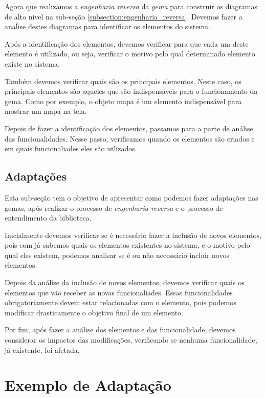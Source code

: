 Agora que realizamos a \emph{engenharia reversa} da \emph{gema} para construir os diagramas
de alto nível na sub-seção \ref{subsection:engenharia_reversa}. Devemos fazer a anaĺise destes
diagramas para identificar os elementos do sistema.

Após a identificação dos elementos, devemos verificar para que cada um deste elemento é utilizado, ou seja,
verificar o motivo pelo qual determinado elemento existe no sistema.

Também devemos verificar quais são os principais elementos. Neste caso, os principais elementos
são aqueles que são indispensáveis para o funcionamento da gema. Como por exemplo, o objeto mapa
é um elemento indispensável para mostrar um mapa na tela.

Depois de fazer a identificação dos elementos, passamos para a parte de análise das funcionalidades.
Nesse passo, verificamos quando os elementos são criados e em quais funcionaliades eles são utlizados.


\subsection{Adaptações}
\label{subsection:adaptações}


Esta sub-seção tem o objetivo de apresentar como podemos fazer adaptações nas gemas, após realizar o
processo de \emph{engenharia reversa} e o processo de entendimento da biblioteca.

Inicialmente devemos verificar se é necessário fazer a inclusão de novos elementos, pois com já sabemos
quais os elementos existentes no sistema, e o motivo pelo qual eles existem, podemos analisar se é ou não
necessário incluir novos elementos.

Depois da análise da inclusão de novos elementos, devemos verificar quais os elementos que vão receber
as novas funcionaliades. Essas funcionalidades obrigatoriamente devem estar relacionadas com o elemento,
pois podemos modificar drasticamente o objetivo final de um elemento.

Por fim, após fazer a análise dos elementos e das funcionalidade, devemos considerar os impactos das modificações,
verificando se nenhuma funcionalidade, já existente, foi afetada.


\section{Exemplo de Adaptação}
\label{section:exemplo_de_adaptação}



